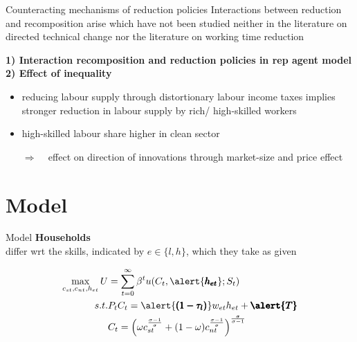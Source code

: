 \documentclass[11pt,aspectratio=169]{beamer}
\newcommand{\ar}{$\Rightarrow$ \ }
\begin{document}
\begin{frame}{Counteracting mechanisms of reduction policies}
	Interactions between reduction and recomposition arise which have not been studied neither in the literature on directed technical change nor the literature on working time reduction
	
	\textbf{1) Interaction recomposition and reduction policies in rep agent model}\\
	\textbf{2) Effect of inequality}
	\begin{itemize}
		\item reducing labour supply through distortionary labour income taxes implies stronger reduction in labour supply by rich/ high-skilled workers
		\item high-skilled labour share higher in clean sector \cite{Consoli2016DoCapital}
		\item[\ar] effect on direction of innovations through market-size and  price effect
	\end{itemize}
\end{frame}

\section{Model}
\begin{frame}{Model}
\textbf{Households}
\\
differ wrt the skills, indicated by $e\in\{l,h\}$, which they take as given 

\begin{align*}
\max_{c_{st}, c_{nt}, h_{et}}U&=\sum_{t=0}^{\infty}\beta^t u(C_t,\alert{\pmb{h_{et}}}; S_t)\\
s.t.& P_t C_t=\alert{\pmb{(1-\tau_l)}}w_{et}h_{et}+\pmb{\alert{T}}\\
& C_t= \left(\omega c_{st}^{\frac{\sigma-1}{\sigma}}+(1-\omega)c_{nt}^\frac{\sigma-1}{\sigma}\right)^\frac{\sigma}{\sigma-1}
\end{align*}
\end{frame}
\end{document}
